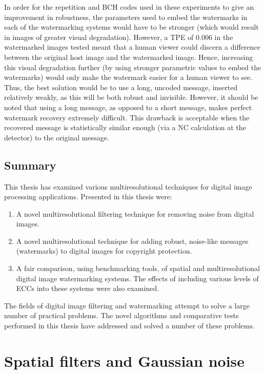 \documentclass[12pt]{report}
\begin{document}
In order for the repetition and BCH codes used in these experiments to give an improvement
in robustness, the parameters used to embed the watermarks in each of the watermarking systems
would have to be stronger (which would result in images of greater visual degradation). However, a TPE of
0.006 in the watermarked images tested meant that a human viewer could discern a difference 
between the original host image and the watermarked image. Hence, increasing this visual degradation
further (by using stronger parametric values to embed the watermarks) would only make the 
watermark easier for a human viewer to see. Thus, the best solution would be to use 
a long, uncoded message, inserted relatively weakly, as this will be both robust and 
invisible.
However, it should be noted that using a long message, as opposed to a short message, makes
perfect watermark recovery extremely difficult.
This drawback is acceptable when the recovered message is statistically similar enough
(via a NC calculation at the detector) to the original message.

\section{Summary}
This thesis has examined various multiresolutional techniques for digital image processing applications.
Presented in this thesis were: 
\begin{enumerate}
	\item A novel multiresolutional filtering technique for removing noise from digital images.
	\item A novel multiresolutional technique for adding robust, noise-like messages (watermarks) to digital images for copyright protection.
	\item A fair comparison, using benchmarking tools, of spatial and multiresolutional digital image watermarking systems.
	      The effects of including various levels of ECCs into these systems were also examined.	
\end{enumerate}
The fields of digital image filtering and watermarking attempt to solve a large number of practical problems.
The novel algorithms and comparative tests performed in this thesis have addressed and solved a number of these problems.


\appendix

\chapter{Spatial filters and Gaussian noise}
\label{chapter:attacks}
\end{document}

